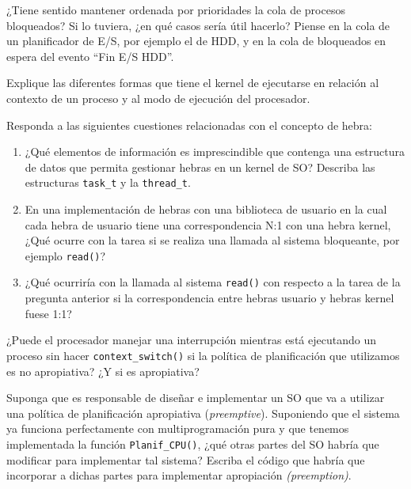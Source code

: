\begin{ejercicio}
    ¿Tiene sentido mantener ordenada por prioridades la cola de procesos bloqueados? Si lo tuviera, ¿en qué casos sería útil hacerlo? Piense en la cola de un planificador de E/S, por ejemplo el de HDD, y en la cola de bloqueados en espera del evento ``Fin E/S HDD''.
\end{ejercicio}

\begin{ejercicio}
    Explique las diferentes formas que tiene el kernel de ejecutarse en relación al contexto de un proceso y al modo de ejecución del procesador.
\end{ejercicio}

\begin{ejercicio}
    Responda a las siguientes cuestiones relacionadas con el concepto de hebra:
    \begin{enumerate}
        \item ¿Qué elementos de información es imprescindible que contenga una estructura de datos que permita gestionar hebras en un kernel de SO? Describa las estructuras \verb|task_t| y la \verb|thread_t|.
        \item En una implementación de hebras con una biblioteca de usuario en la cual cada hebra de usuario tiene una correspondencia N:1 con una hebra kernel, ¿Qué ocurre con la tarea si se realiza una llamada al sistema bloqueante, por ejemplo \verb|read()|?
        \item ¿Qué ocurriría con la llamada al sistema \verb|read()| con respecto a la tarea de la pregunta anterior si la correspondencia entre hebras usuario y hebras kernel fuese 1:1?
    \end{enumerate}
\end{ejercicio}

\begin{ejercicio}
    ¿Puede el procesador manejar una interrupción mientras está ejecutando un proceso sin hacer \verb|context_switch()| si la política de planificación que utilizamos es no apropiativa? ¿Y si es apropiativa?
\end{ejercicio}

\begin{ejercicio}
    Suponga que es responsable de diseñar e implementar un SO que va a utilizar una política de planificación apropiativa (\emph{preemptive}). Suponiendo que el sistema ya funciona perfectamente con multiprogramación pura y que tenemos implementada la función \verb|Planif_CPU()|, ¿qué otras partes del SO habría que modificar para implementar tal sistema? Escriba el código que habría que incorporar a dichas partes para implementar apropiación \emph{(preemption)}.
\end{ejercicio}

